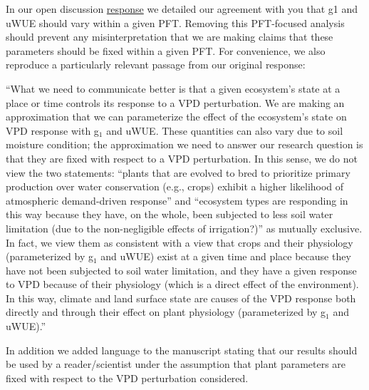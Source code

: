 \documentclass[12pt]{article}
\begin{document}
In our open discussion
\href{https://editor.copernicus.org/index.php/hess-2018-553-AC1.pdf}{response}
we detailed our agreement with you that g1 and uWUE should vary within
a given PFT. Removing this PFT-focused analysis should prevent any
misinterpretation that we are making claims that these parameters
should be fixed within a given PFT. For convenience, we also reproduce
a particularly relevant passage from our original response:

\medskip

``What we need to communicate better is that a given ecosystem's state
at a place or time controls its response to a VPD perturbation. We are
making an approximation that we can parameterize the effect of the
ecosystem's state on VPD response with g$_1$ and uWUE. These quantities
can also vary due to soil moisture condition; the approximation we
need to answer our research question is that they are fixed
with respect to a VPD perturbation. In this sense, we do not view the
two statements: ``plants that are evolved to bred to prioritize
primary production over water conservation (e.g., crops) exhibit a
higher likelihood of atmospheric demand-driven response'' and
``ecosystem types are responding in this way because they have, on the
whole, been subjected to less soil water limitation (due to the
non-negligible effects of irrigation?)'' as mutually exclusive. In
fact, we view them as consistent with a view that crops and their
physiology (parameterized by g$_1$ and uWUE) exist at a given time and
place because they have not been subjected to soil water limitation,
and they have a given response to VPD because of their physiology
(which is a direct effect of the environment). In this way, climate
and land surface state are causes of the VPD response both directly
and through their effect on plant physiology (parameterized by g$_1$
and uWUE).''

\medskip

In addition we added language to the manuscript stating that our
results should be used by a reader/scientist under the assumption that
plant parameters are fixed with respect to the VPD perturbation
considered.
\end{document}
